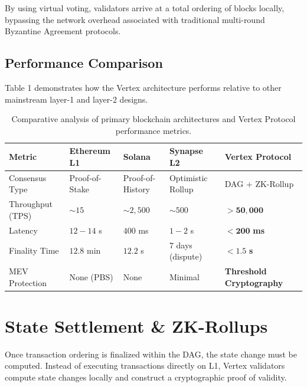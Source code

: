 \documentclass[10pt]{article}
\begin{document}
By using virtual voting, validators arrive at a total ordering of blocks locally, bypassing the network overhead associated with traditional multi-round Byzantine Agreement protocols.

\subsection{Performance Comparison}
Table 1 demonstrates how the Vertex architecture performs relative to other mainstream layer-1 and layer-2 designs.

\begin{table}[H]
\centering
\sffamily
\small
\begin{tabularx}{\textwidth}{lXXXX}
\toprule
\textbf{Metric} & \textbf{Ethereum L1} & \textbf{Solana} & \textbf{Synapse L2} & \textbf{Vertex Protocol} \\
\midrule
Consensus Type & Proof-of-Stake & Proof-of-History & Optimistic Rollup & DAG + ZK-Rollup \\
Throughput (TPS) & $\sim 15$ & $\sim 2,500$ & $\sim 500$ & $\mathbf{> 50,000}$ \\
Latency & $12 - 14$ s & $400$ ms & $1 - 2$ s & $\mathbf{< 200}$ \textbf{ms} \\
Finality Time & $12.8$ min & $12.2$ s & $7$ days (dispute) & $\mathbf{< 1.5}$ \textbf{s} \\
MEV Protection & None (PBS) & None & Minimal & \textbf{Threshold Cryptography} \\
\bottomrule
\end{tabularx}
\caption{Comparative analysis of primary blockchain architectures and Vertex Protocol performance metrics.}
\label{tab:comparison}
\end{table}

\section{State Settlement \& ZK-Rollups}
Once transaction ordering is finalized within the DAG, the state change must be computed. Instead of executing transactions directly on L1, Vertex validators compute state changes locally and construct a cryptographic proof of validity.
\end{document}
